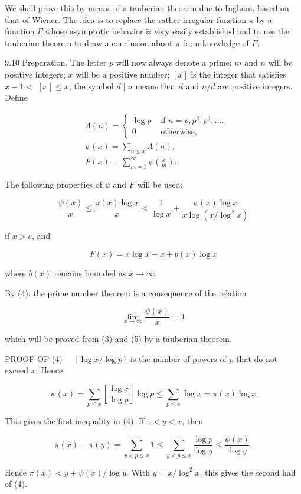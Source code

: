 \documentclass[10pt]{article}
\begin{document}
We shall prove this by means of a tauberian theorem due to Ingham, based on that of Wiener. The idea is to replace the rather irregular function $\pi$ by a function $F$ whose asymptotic behavior is very easily established and to use the tauberian theorem to draw a conclusion about $\pi$ from knowledge of $F$.

9.10 Preparation. The letter $p$ will now always denote a prime; $m$ and $n$ will be positive integers; $x$ will be a positive number; $[x]$ is the integer that satisfies $x-1<$ $[x] \leq x$; the symbol $d \mid n$ means that $d$ and $n / d$ are positive integers. Define

$$
\begin{aligned}
& \Lambda(n)= \begin{cases}\log p & \text { if } n=p, p^{2}, p^{3}, \ldots, \\
0 & \text { otherwise, }\end{cases} \\
& \psi(x)=\sum_{n \leq x} \Lambda(n), \\
& F(x)=\sum_{m=1}^{\infty} \psi\left(\frac{x}{m}\right) .
\end{aligned}
$$

The following properties of $\psi$ and $F$ will be used:

$$
\frac{\psi(x)}{x} \leq \frac{\pi(x) \log x}{x}<\frac{1}{\log x}+\frac{\psi(x) \log x}{x \log \left(x / \log ^{2} x\right)}
$$

if $x>e$, and

$$
F(x)=x \log x-x+b(x) \log x
$$

where $b(x)$ remains bounded as $x \rightarrow \infty$.

By (4), the prime number theorem is a consequence of the relation

$$
\lim _{x \rightarrow \infty} \frac{\psi(x)}{x}=1
$$

which will be proved from (3) and (5) by a tauberian theorem.

PROOF OF (4) $\quad[\log x / \log p]$ is the number of powers of $p$ that do not exceed $x$. Hence

$$
\psi(x)=\sum_{p \leq x}\left[\frac{\log x}{\log p}\right] \log p \leq \sum_{p \leq x} \log x=\pi(x) \log x
$$

This gives the first inequality in (4). If $1<y<x$, then

$$
\pi(x)-\pi(y)=\sum_{y<p \leq x} 1 \leq \sum_{y<p \leq x} \frac{\log p}{\log y} \leq \frac{\psi(x)}{\log y} .
$$

Hence $\pi(x)<y+\psi(x) / \log y$. With $y=x / \log ^{2} x$, this gives the second half of (4).
\end{document}
